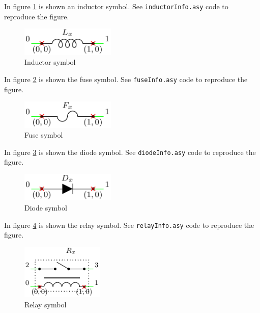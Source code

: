 \documentclass[a4paper,12pt]{report}
\begin{document}
In figure \ref{fig:inductorInfo} is shown an inductor symbol. See \texttt{inductorInfo.asy} code to reproduce the figure.

\begin{figure}[ht]
\centering
\includegraphics[width=0.4\textwidth]{inductorInfo}
\caption{Inductor symbol}
\label{fig:inductorInfo}
\end{figure}

In figure \ref{fig:fuseInfo} is shown the fuse symbol. See \texttt{fuseInfo.asy} code to reproduce the figure.

\begin{figure}[ht]
\centering
\includegraphics[width=0.4\textwidth]{fuseInfo}
\caption{Fuse symbol}
\label{fig:fuseInfo}
\end{figure}

In figure \ref{fig:diodeInfo} is shown the diode symbol. See \texttt{diodeInfo.asy} code to reproduce the figure.

\begin{figure}[ht]
\centering
\includegraphics[width=0.4\textwidth]{diodeInfo}
\caption{Diode symbol}
\label{fig:diodeInfo}
\end{figure}

In figure \ref{fig:relayInfo} is shown the relay symbol. See \texttt{relayInfo.asy} code to reproduce the figure.

\begin{figure}[ht]
\centering
\includegraphics[width=0.35\textwidth]{relayInfo}
\caption{Relay symbol}
\label{fig:relayInfo}
\end{figure}
\end{document}
